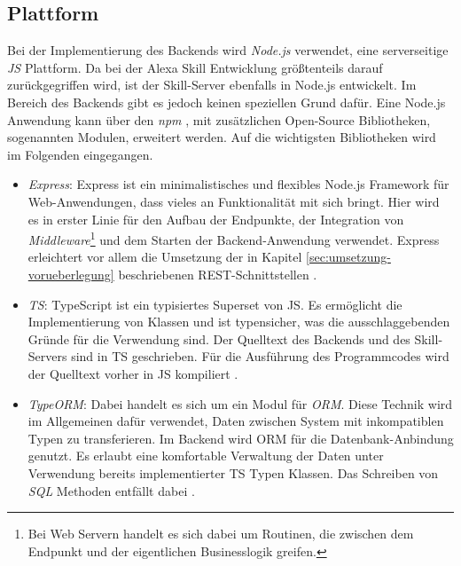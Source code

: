\subsection{Plattform}
\label{backend-plattform}
Bei der Implementierung des Backends wird \textit{Node.js} \cite{node-js} verwendet, eine serverseitige \textit{\ac{JS}} Plattform. Da bei der Alexa Skill Entwicklung größtenteils darauf zurückgegriffen wird, ist der Skill-Server ebenfalls in Node.js entwickelt. Im Bereich des Backends gibt es jedoch keinen speziellen Grund dafür. Eine Node.js Anwendung kann über den \textit{\ac{npm}} \cite{npm}, mit zusätzlichen Open-Source Bibliotheken, sogenannten Modulen, erweitert werden. Auf die wichtigsten Bibliotheken wird im Folgenden eingegangen.

\begin{itemize}
    \item \textit{Express}: Express ist ein minimalistisches und flexibles Node.js Framework für Web-Anwendungen, dass vieles an Funktionalität mit sich bringt. Hier wird es in erster Linie für den Aufbau der Endpunkte, der Integration von \textit{Middleware}\footnote{Bei Web Servern handelt es sich dabei um Routinen, die zwischen dem Endpunkt und der eigentlichen Businesslogik greifen.} und dem Starten der Backend-Anwendung verwendet. Express erleichtert vor allem die Umsetzung der in Kapitel \ref{sec:umsetzung-vorueberlegung} beschriebenen \ac{REST}-Schnittstellen \cite{express-js}.
    
    \item \textit{\ac{TS}}: TypeScript ist ein typisiertes Superset von \ac{JS}. Es ermöglicht die Implementierung von Klassen und ist typensicher, was die ausschlaggebenden Gründe für die Verwendung sind. Der Quelltext des Backends und des Skill-Servers sind in \ac{TS} geschrieben. Für die Ausführung des Programmcodes wird der Quelltext vorher in \ac{JS} kompiliert \cite{typescript}. 
    
    \item \textit{TypeORM}: Dabei handelt es sich um ein Modul für \textit{\ac{ORM}}. Diese Technik wird im Allgemeinen dafür verwendet, Daten zwischen System mit inkompatiblen Typen zu transferieren. Im Backend wird \ac{ORM} für die Datenbank-Anbindung genutzt. Es erlaubt eine komfortable Verwaltung der Daten unter Verwendung bereits implementierter \ac{TS} Typen \bzw Klassen. Das Schreiben von \textit{\ac{SQL}} Methoden entfällt dabei \cite{typeorm}.
    

\end{itemize}
